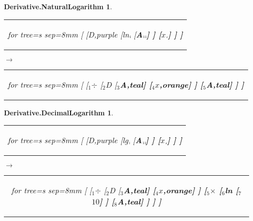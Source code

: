 \documentclass[UTF8,10pt]{ctexart}
\newcommand{\Bigskip}{\bigskip\medskip}
\newcommand{\subtreeA}{\bf A}
\newcommand{\I}{$_{\scriptscriptstyle 1}$}
\newcommand{\II}{$_{\scriptscriptstyle 2}$}
\newcommand{\III}{$_{\scriptscriptstyle 3}$}
\newcommand{\IV}{$_{\scriptscriptstyle 4}$}
\newcommand{\V}{$_{\scriptscriptstyle 5}$}
\newcommand{\VI}{$_{\scriptscriptstyle 6}$}
\newcommand{\VII}{$_{\scriptscriptstyle 7}$}
\newcommand{\VIII}{$_{\scriptscriptstyle 8}$}
\newcommand{\lc}{$_{\:\!\scriptscriptstyle\rm l\!}$}
\newcommand{\rc}{$_{\:\!\scriptscriptstyle\rm r\!}$}
\newcommand{\Derivative}{\rm D}
\newcommand{\x}{$x$}
\newcommand{\Ten}{$10$}
\newcommand{\Multiplication}{$\times$}
\newcommand{\Division}{$\div$}
\newcommand{\NaturalLogarithm}{\rm ln}
\newcommand{\DecimalLogarithm}{\rm lg}
\newtheorem*{Derivative.NaturalLogarithm}{\bf Derivative.NaturalLogarithm }
\newtheorem*{Derivative.DecimalLogarithm}{\bf Derivative.DecimalLogarithm }
\begin{document}
	\newpage

	\begin{center}\vspace*{\fill}
		\begin{Derivative.NaturalLogarithm}
			\qquad\par\Bigskip
			\begin{tabular}{c}
				\begin{forest}
					for tree={s sep=8mm}
					[
						[\Derivative,purple
							[\NaturalLogarithm\lc
								[\subtreeA\lc\lc]
							]
							[\x\rc]
						]
					]
				\end{forest}
			\end{tabular}
			\qquad
			$\longrightarrow$
			\qquad
			\begin{tabular}{c}
				\begin{forest}
					for tree={s sep=8mm}
					[
						[\I\Division
							[\II\Derivative
								[\III\subtreeA,teal]
								[\IV\x,orange]
							]
							[\V\subtreeA,teal]
						]
					]
				\end{forest}
			\end{tabular}
		\end{Derivative.NaturalLogarithm}
		\bigskip
		\begin{Derivative.DecimalLogarithm}
			\qquad\par\Bigskip
			\begin{tabular}{c}
				\begin{forest}
					for tree={s sep=8mm}
					[
						[\Derivative,purple
							[\DecimalLogarithm\lc
								[\subtreeA\lc\lc]
							]
							[\x\rc]
						]
					]
				\end{forest}
			\end{tabular}
			\qquad
			$\longrightarrow$
			\qquad
			\begin{tabular}{c}
				\begin{forest}
					for tree={s sep=8mm}
					[
						[\I\Division
							[\II\Derivative
								[\III\subtreeA,teal]
								[\IV\x,orange]
							]
							[\V\Multiplication
								[\VI\NaturalLogarithm
									[\VII\Ten]
								]
								[\VIII\subtreeA,teal]
							]
						]
					]
				\end{forest}
			\end{tabular}
		\end{Derivative.DecimalLogarithm}
	\vspace*{\fill}\end{center}

	\newpage
\end{document}
